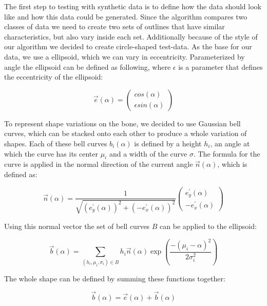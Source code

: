 \documentclass[pdftex,12pt,a4paper]{report}
\begin{document}
The first step to testing with synthetic data is to define how the data should look like and how this data could be generated. Since the algorithm compares two classes of data we need to create two sets of outlines that have similar characteristics, but also vary inside each set. Additionally because of the style of our algorithm we decided to create circle-shaped test-data. As the base for our data, we use a ellipsoid, which we can vary in eccentricity. Parameterized by angle the ellipsoid can be defined as following, where $\epsilon$ is a parameter that defines the eccentricity of the ellipsoid:

\begin{equation}
	\vec{e}(\alpha) = \left( \begin{array}{c}
		cos(\alpha) \\
		\epsilon sin(\alpha)
	\end{array} \right) 
\end{equation}

To represent shape variations on the bone, we decided to use Gaussian bell curves, which can be stacked onto each other to produce a whole variation of shapes. Each of these bell curves $b_i(\alpha)$ is defined by a height $h_i$, an angle at which the curve has its center $\mu_i$ and a width of the curve $\sigma$. The formula for the curve is applied in the normal direction of the current angle $\vec{n}(\alpha)$, which is defined as:

\begin{equation}
	\vec{n}(\alpha) = \frac{1}{\sqrt{(e_y^\prime(\alpha))^2 + (-e_x^\prime(\alpha))^2}}\left( \begin{array}{c}
		e_y^\prime(\alpha) \\
		-e_x^\prime(\alpha)
	\end{array} \right)
\end{equation}

Using this normal vector the set of bell curves $B$ can be applied to the ellipsoid:

\begin{equation}
	\vec{b}(\alpha) = \sum_{(h_i, \mu_i, \sigma_i) \in B}h_i \vec{n}(\alpha) \exp\left(\frac{-(\mu_i - \alpha)^2}{2 \sigma_i^2} \right )
\end{equation}

The whole shape can be defined by summing these functions together:

\begin{equation}
	\vec{b}(\alpha) = \vec{e}(\alpha) + \vec{b}(\alpha)
\end{equation}
\end{document}
